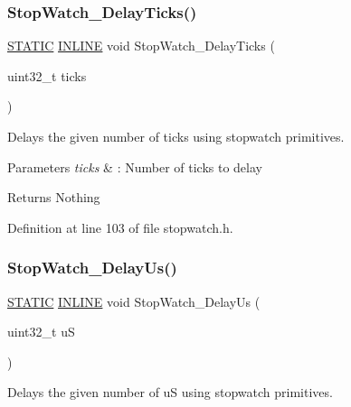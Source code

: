 \subsubsection{\texorpdfstring{Stop\+Watch\+\_\+\+Delay\+Ticks()}{StopWatch\_DelayTicks()}}
{\footnotesize\ttfamily \hyperlink{group___l_p_c___types___public___macros_ga10b2d890d871e1489bb02b7e70d9bdfb}{S\+T\+A\+T\+IC} \hyperlink{spifi__18xx__43xx_8h_a2eb6f9e0395b47b8d5e3eeae4fe0c116}{I\+N\+L\+I\+NE} void Stop\+Watch\+\_\+\+Delay\+Ticks (\begin{DoxyParamCaption}\item[{uint32\+\_\+t}]{ticks }\end{DoxyParamCaption})}



Delays the given number of ticks using stopwatch primitives. 


\begin{DoxyParams}{Parameters}
{\em ticks} & \+: Number of ticks to delay \\
\hline
\end{DoxyParams}
\begin{DoxyReturn}{Returns}
Nothing 
\end{DoxyReturn}


Definition at line 103 of file stopwatch.\+h.

\mbox{\label{group___stop___watch_ga3bc7706d1a9cb32888f82b2874c3655c}} 
\subsubsection{\texorpdfstring{Stop\+Watch\+\_\+\+Delay\+Us()}{StopWatch\_DelayUs()}}
{\footnotesize\ttfamily \hyperlink{group___l_p_c___types___public___macros_ga10b2d890d871e1489bb02b7e70d9bdfb}{S\+T\+A\+T\+IC} \hyperlink{spifi__18xx__43xx_8h_a2eb6f9e0395b47b8d5e3eeae4fe0c116}{I\+N\+L\+I\+NE} void Stop\+Watch\+\_\+\+Delay\+Us (\begin{DoxyParamCaption}\item[{uint32\+\_\+t}]{uS }\end{DoxyParamCaption})}



Delays the given number of uS using stopwatch primitives. 


